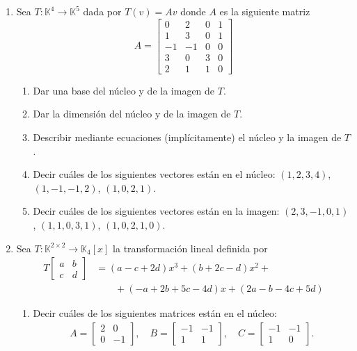 \begin{enumerate}[topsep=6pt, itemsep=.4cm]
\item Sea $T: \mathbb{K}^4 \to \mathbb{K}^5$ dada por $T(v) = Av$ donde $A$ es la siguiente matriz
    $$
    A=\begin{bmatrix}
    0& 2& 0&1\\   1& 3& 0&1\\  -1&-1&0&0\\3&0&3&0\\2&1&1&0 \end{bmatrix}
    $$
    \begin{enumerate}[topsep=5pt,itemsep=5pt]
        \item Dar una base del núcleo y de la imagen de $T$. 
        \item Dar la dimensión del núcleo y de la imagen de $T$.
        \item Describir mediante ecuaciones (implícitamente) el núcleo y la imagen de $T$.
        \item Decir cuáles de los siguientes vectores están en el núcleo:
        $(1,2,3,4)$, $(1,-1,-1,2)$, $(1,0,2,1)$.
        \item Decir cuáles de los siguientes vectores están en la imagen:
        $(2,3,-1,0,1)$, $(1,1,0,3,1)$, $(1,0,2,1,0)$.
    \end{enumerate}
    

\item Sea $T:\mathbb{K}^{2\times 2}\longrightarrow\mathbb{K}_{4}[x]$ la transformación lineal definida por
    \begin{align*}
    T   \begin{bmatrix}  a&b\\c&d \end{bmatrix} &= (a-c+2d)x^3+(b+2c-d)x^2+ \\
    &\qquad+(-a+2b+5c-4d)x+(2a-b-4c+5d)
    \end{align*}
    \begin{enumerate}
        \item Decir cuáles de los siguientes matrices están en el núcleo:
            \begin{align*}
                A=\begin{bmatrix}
                    2&0\\0&-1
                \end{bmatrix},
            \quad
            B=\begin{bmatrix}
                -1&-1\\1&1
            \end{bmatrix},
            \quad
            C=\begin{bmatrix}
                -1&-1\\1&0
            \end{bmatrix}.
            \end{align*}


\end{enumerate}
\end{enumerate}
